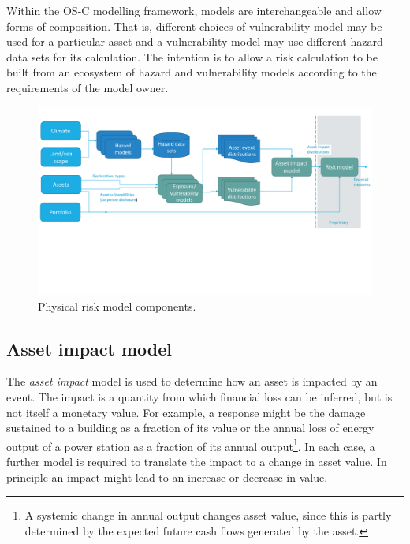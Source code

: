 \documentclass[a4paper,11pt]{extarticle} %
\begin{document}
Within the OS-C modelling framework, models are interchangeable and allow forms of composition. That is, different choices of vulnerability model may be used for a particular asset and a vulnerability model may use different hazard data sets for its calculation. The intention is to allow a risk calculation to be built from an ecosystem of hazard and vulnerability models according to the requirements of the model owner.

\begin{figure}[ht]

    \begin{framed}
        \includegraphics[clip, trim=0cm 7cm 0cm 1cm, width=1.00\textwidth]{plots/top_level_view.pdf}

    \end{framed}

    \footnotesize

    \renewcommand{\arraystretch}{1.01}

    \vspace{-3ex}

    \vspace{-0.5ex}

    \caption{\small Physical risk model components. }
    \label{Fig:top_level_view}

\end{figure}

\subsection{Asset impact model}
The {\it asset impact} model is used to determine how an asset is impacted by an event. The impact is a quantity from which financial loss can be inferred, but is not itself a monetary value. For example, a response might be the damage sustained to a building as a fraction of its value or the annual loss of energy output of a power station as a fraction of its annual output\footnote{A systemic change in annual output changes asset value, since this is partly determined by the expected future cash flows generated by the asset.}. In each case, a further model is required to translate the impact to a change in asset value. In principle an impact might lead to an increase or decrease in value.
\end{document}
